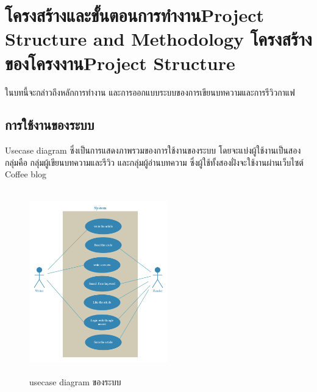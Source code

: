 \chapter{\ifproject%
\ifcpe โครงสร้างและขั้นตอนการทำงาน\else Project Structure and Methodology\fi
\else%
\ifcpe โครงสร้างของโครงงาน\else Project Structure\fi
\fi
}

ในบทนี้จะกล่าวถึงหลักการทำงาน และการออกแบบระบบของการเขียนบทความและการรีวิวกาแฟ

\makeatletter


\makeatother

\section{การใช้งานของระบบ}
Usecase diagram ซึ่งเป็นการแสดงภาพรวมของการใช้งานของระบบ โดยจะแบ่งผู้ใช้งานเป็นสองกลุ่มคือ กลุ่มผู้เขียนบทความและรีวิว และกลุ่มผู้อ่านบทความ ซึ่งผู้ใช้ทั้งสองฝั่งจะใช้งานผ่านเว็บไซต์ Coffee blog 

\begin{figure}[h]
\begin{center}
\includegraphics[width=6cm, height=8cm]{usecase-diagram.jpg}
\end{center}
\caption[Usecase diagram]{usecase diagram ของระบบ}
\end{figure}

